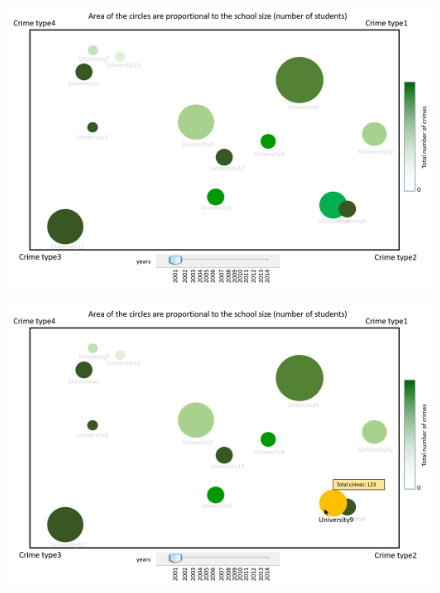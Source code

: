 \documentclass[12pt]{article}
\begin{document}
\begin{figure}[tbph]
   \centering{}
	       \includegraphics[width=6in]{prot2-overall}           
\caption{}
\label{fig:p2-overall}
\end{figure}

\begin{figure}[tbph]
   \centering{}
	       \includegraphics[width=6in]{prot2-1}           
\caption{}
\label{fig:p2-1}
\end{figure}
\end{document}
